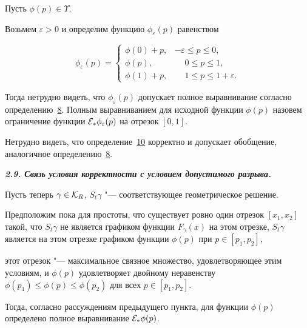 \begin{definition}[10]Пусть $\phi(p)\in\Upsilon$. 

Возьмем $\varepsilon>0$ и определим функцию $\phi_\varepsilon(p)$ равенством

$$

\phi_{\varepsilon}(p)=\left\{

\begin{array}{cl}

\phi(0)+p,&-\varepsilon\le p\le0,\\

\phi(p),& \phantom{-}0\le p\le1,\\

\phi(1)+p,&\phantom{-}1\le p\le1+\varepsilon.

\end{array}\right.

$$

Тогда нетрудно видеть, что $\phi_{\varepsilon}(p)$ допускает полное выравнивание согласно определению~\hyperlink{palin:definition8}{8}. Полным выравниванием для исходной функции $\phi(p)$ назовем ограничение функции ${\cal E}_*\phi_{\varepsilon}(p)$ на отрезок $[0,1]$.

\end{definition}



\smallskip



Нетрудно видеть, что определение~\hyperlink{palin:definition10}{10} корректно и допускает обобщение, аналогичное определению~\hyperlink{palin:definition8}{8}.



\smallskip



{\bf \itshape 2.9. Связь условия корректности с условием допустимого разрыва.}

Пусть теперь $\gamma\in{\cal K}_R$, $S_t\gamma$ "--- соответствующее геометрическое решение. 

Предположим пока для простоты, что существует ровно один отрезок $[x_1,x_2]$ такой, что $S_t\gamma$ не является графиком функции $F_{\gamma}(x)$ на этом отрезке, $S_t\gamma$ является на этом отрезке графиком функции $\phi(p)$ при $p\in[p_1,p_2]$, 

этот отрезок "--- максимальное связное множество, удовлетворяющее этим условиям, и $\phi(p)$ удовлетворяет двойному неравенству $\phi(p_1)\le\phi(p)\le\phi(p_2)$ для всех $p\in[p_1,p_2]$. 

Тогда, согласно рассуждениям предыдущего пункта, для функции $\phi(p)$ определено полное выравнивание ${\cal E}_*\phi(p)$. 



